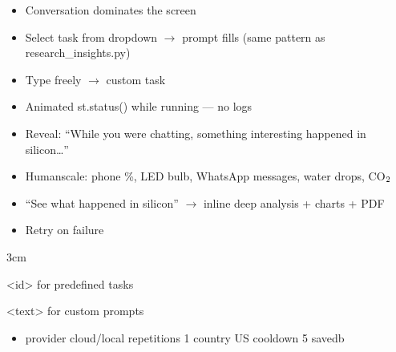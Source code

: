 \documentclass[letterpaper,10pt,english]{sphinxmanual}
\begin{document}
\begin{description}
\begin{itemize}
\item {} 
\sphinxAtStartPar
Conversation dominates the screen

\item {} 
\sphinxAtStartPar
Select task from dropdown \(\rightarrow\) prompt fills (same pattern as research\_insights.py)

\item {} 
\sphinxAtStartPar
Type freely \(\rightarrow\) custom \textendash{}task

\item {} 
\sphinxAtStartPar
Animated st.status() while running — no logs

\item {} 
\sphinxAtStartPar
Reveal: “While you were chatting, something interesting happened in silicon…”

\item {} 
\sphinxAtStartPar
Human\sphinxhyphen{}scale: phone \%, LED bulb, WhatsApp messages, water drops, CO\(\sb{\text{2}}\)

\item {} 
\sphinxAtStartPar
“See what happened in silicon” \(\rightarrow\) inline deep analysis + charts + PDF

\item {} 
\sphinxAtStartPar
Retry on failure

\end{itemize}

\begin{optionlist}{3cm}
\item [\sphinxhyphen{}\sphinxhyphen{}task\sphinxhyphen{}id]  
\sphinxAtStartPar
\textless{}id\textgreater{}   for predefined tasks
\item [\sphinxhyphen{}\sphinxhyphen{}task]  
\sphinxAtStartPar
\textless{}text\textgreater{} for custom prompts
\end{optionlist}
\begin{itemize}
\item {} 
\sphinxAtStartPar
\textendash{}provider cloud/local \textendash{}repetitions 1 \textendash{}country US \textendash{}cool\sphinxhyphen{}down 5 \textendash{}save\sphinxhyphen{}db

\end{itemize}

\end{description}
\end{document}
